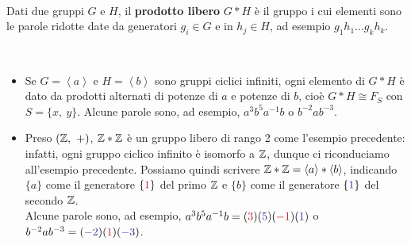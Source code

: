 \begin{define}~{}\\
	Dati due gruppi $G$ e $H$, il \textbf{prodotto libero} $G\ast H$ è il gruppo i cui elementi sono le parole ridotte date da generatori $g_i\in G$ e in $h_j\in H$, ad esempio $g_1h_1\ldots g_k h_k$.
\end{define}
\begin{example}~{}
		\begin{itemize}
		\item Se $G=\left<a\right>$ e $H=\left<b\right>$ sono gruppi ciclici infiniti, ogni elemento di $G\ast H$ è dato da prodotti alternati di potenze di $a$ e potenze di $b$, cioè $G\ast H\cong F_S$ con $S=\{x,\ y\}$. Alcune parole sono, ad esempio, $a^3b^5a^{-1}b$ o $b^{-2}ab^{-3}$.
		\item Preso $\left(\integerset,\ +\right)$, $\mathbb{Z}\ast\mathbb{Z}$ è un gruppo libero di rango 2 come l'esempio precedente: infatti, ogni gruppo ciclico infinito è isomorfo a $\mathbb{Z}$, dunque ci riconduciamo all'esempio precedente. Possiamo quindi scrivere $\mathbb{Z}\ast\mathbb{Z}=\left<a\right>\ast\left<b\right>$, indicando $\{a\}$ come il generatore $\{\textcolor{redill}{1}\}$ del primo $\mathbb{Z}$ e $\{b\}$ come il generatore $\{\textcolor{blueill}{1}\}$ del secondo $\mathbb{Z}$.\\
		Alcune parole sono, ad esempio, $a^3b^5a^{-1}b=(\textcolor{redill}{3})(\textcolor{blueill}{5})(\textcolor{redill}{-1})(\textcolor{blueill}{1})$ o $b^{-2}ab^{-3}=(\textcolor{blueill}{-2})(\textcolor{redill}{1})(\textcolor{blueill}{-3})$.
	\end{itemize}
\vspace{-3mm}
\end{example}
